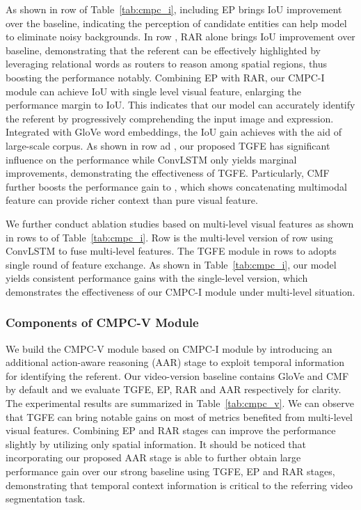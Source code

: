 \documentclass[10pt,journal,cspaper,compsoc]{IEEEtran}
\begin{document}
As shown in row  of Table~\ref{tab:cmpc_i}, including EP brings  IoU improvement over the baseline, indicating the perception of candidate entities can help model to eliminate noisy backgrounds. 
In row , RAR alone brings  IoU improvement over baseline, demonstrating that the referent can be effectively highlighted by leveraging relational words as routers to reason among spatial regions, thus boosting the performance notably. 
Combining EP with RAR, our CMPC-I module can achieve  IoU with single level visual feature, enlarging the performance margin to  IoU. 
This indicates that our model can accurately identify the referent by progressively comprehending the input image and expression. 
Integrated with GloVe word embeddings, the IoU gain achieves  with the aid of large-scale corpus. 
As shown in row  ad , our proposed TGFE has significant influence on the performance while ConvLSTM only yields marginal improvements, demonstrating the effectiveness of TGFE.
Particularly, CMF further boosts the performance gain to , which shows concatenating multimodal feature can provide richer context than pure visual feature. 

We further conduct ablation studies based on multi-level visual features as shown in rows  to  of Table~\ref{tab:cmpc_i}. 
Row  is the multi-level version of row  using ConvLSTM to fuse multi-level features. 
The TGFE module in rows  to  adopts single round of feature exchange. 
As shown in Table~\ref{tab:cmpc_i}, our model yields consistent performance gains with the single-level version, which demonstrates the effectiveness of our CMPC-I module under multi-level situation.

\subsubsection{Components of CMPC-V Module}
We build the CMPC-V module based on CMPC-I module by introducing an additional action-aware reasoning (AAR) stage to exploit temporal information for identifying the referent. 
Our video-version baseline contains GloVe and CMF by default and we evaluate TGFE, EP, RAR and AAR respectively for clarity. 
The experimental results are summarized in Table~\ref{tab:cmpc_v}. 
We can observe that TGFE can bring notable gains on most of metrics benefited from multi-level visual features. 
Combining EP and RAR stages can improve the performance slightly by utilizing only spatial information. 
It should be noticed that incorporating our proposed AAR stage is able to further obtain large performance gain over our strong baseline using TGFE, EP and RAR stages, demonstrating that temporal context information is critical to the referring video segmentation task.
\end{document}
